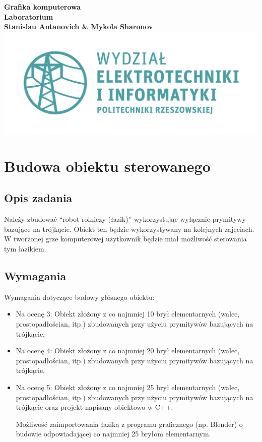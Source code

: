 \documentclass[a4paper, 12pt]{article}
\begin{document}
\begin{titlepage}
\begin{center}
		\vspace*{1cm}
		\textbf{Grafika komputerowa\\Laboratorium\\}
		\vspace{2cm}
		\textbf{Stanislau Antanovich \& Mykola Sharonov}
		\vfill
		\vspace{0.8cm}
		\includegraphics[scale=0.7]{logo.png}
\end{center}
\end{titlepage}

\tableofcontents
\newpage

\section{Budowa obiektu sterowanego}
\subsection{Opis zadania}
Należy zbudować ``robot rolniczy (łazik)'' wykorzystując wyłącznie prymitywy bazujące na trójkącie. Obiekt ten będzie wykorzystywany na kolejnych zajęciach. W tworzonej grze komputerowej użytkownik będzie miał możliwość sterowania tym łazikiem.
\subsection{Wymagania}
Wymagania dotyczące budowy głósnego obiektu:
\begin{itemize}
\item Na ocenę 3:
Obiekt złożony z co najmniej 10 brył elementarnych (walec, prostopadłościan, itp.) zbudowanych przy użyciu prymitywów bazujących na trójkącie.
\item Na ocenę 4:
Obiekt złożony z co najmniej 20 brył elementarnych (walec, prostopadłościan, itp.) zbudowanych przy użyciu prymitywów bazujących na trójkącie.
\item Na ocenę 5:
Obiekt złożony z co najmniej 25 brył elementarnych (walec, prostopadłościan, itp.) zbudowanych przy użyciu prymitywów bazujących na trójkącie oraz projekt napisany obiektowo w C++.

Możliwość zaimportowania łazika z programu graficznego (np. Blender) o budowie odpowiadającej co najmniej 25 bryłom elementarnym.
\end{itemize}
\end{document}
